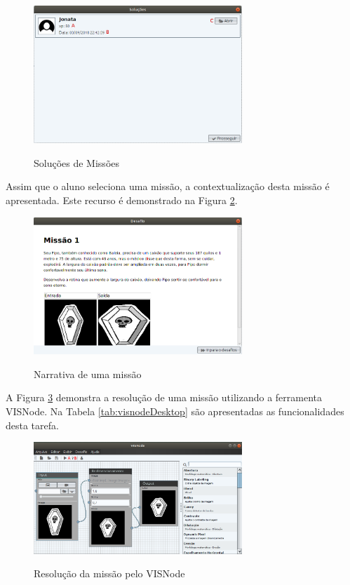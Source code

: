 \documentclass[
	12pt,				%
	oneside,			%
	a4paper,			%
	english,			%
	french,				%
	spanish,			%
	brazil,				%
	]{abntex2}
\begin{document}
\begin{figure}[H]
\centering
\caption{Soluções de Missões}
\includegraphics[width=0.7\textwidth]{imagens/visnode_missoes_solucoes.png}
\sourceAuthor
\label{fig:visnodeMissaoSolucoes}
\end{figure}



Assim que o aluno seleciona uma missão, a contextualização desta missão é apresentada. Este recurso é demonstrado na Figura \ref{fig:visnodeMissaoNarrativa}.

\begin{figure}[H]
\centering
\caption{Narrativa de uma missão}
\includegraphics[width=0.7\textwidth]{imagens/visnode_missao_narrativa.png}
\sourceAuthor
\label{fig:visnodeMissaoNarrativa}
\end{figure}

A Figura \ref{fig:visnodeDesktop} demonstra a resolução de uma missão utilizando a ferramenta VISNode. Na Tabela \ref{tab:visnodeDesktop} são apresentadas as funcionalidades desta tarefa.

\begin{figure}[H]
\centering
\caption{Resolução da missão pelo VISNode}
\includegraphics[width=0.7\textwidth]{imagens/visnode_desktop.png}
\sourceAuthor
\label{fig:visnodeDesktop}
\end{figure}
\end{document}

